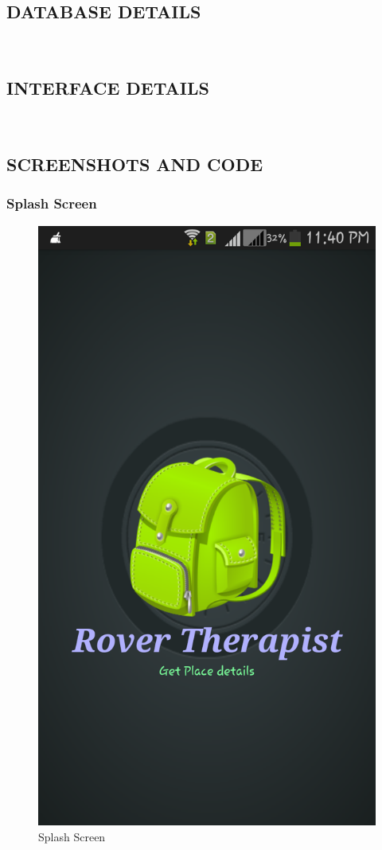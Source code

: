 \documentclass[12pt,a4paper]{article}
\begin{document}
\newpage
\subsection{DATABASE DETAILS}
\\
\newpage
\subsection{INTERFACE DETAILS}
\\
\newpage
\subsection{SCREENSHOTS AND CODE}
\subsubsection{Splash Screen}
\begin{figure}[!htb]
\centering
\includegraphics[width=12 cm]{splash}
\caption{Splash Screen}
\end{figure}
\end{document}

